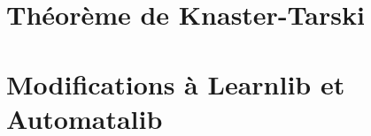 	\newpage
	
	

	\appendix
	\chapter{Théorème de Knaster-Tarski}\label{app:tarski}
	\chapter{Modifications à Learnlib et Automatalib}\label{app:mods}


